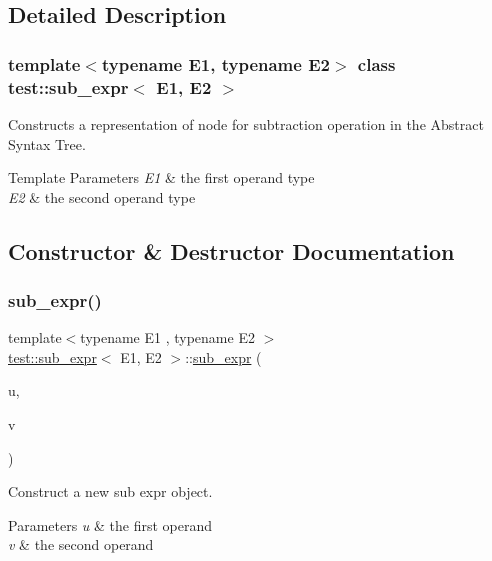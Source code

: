\subsection{Detailed Description}
\subsubsection*{template$<$typename E1, typename E2$>$\newline
class test\+::sub\+\_\+expr$<$ E1, E2 $>$}

Constructs a representation of node for subtraction operation in the Abstract Syntax Tree. 


\begin{DoxyTemplParams}{Template Parameters}
{\em E1} & the first operand type \\
\hline
{\em E2} & the second operand type \\
\hline
\end{DoxyTemplParams}


\subsection{Constructor \& Destructor Documentation}
\mbox{\label{classtest_1_1sub__expr_ac9dc8bae83439a35afd865aeb9ccf463}} 
\subsubsection{\texorpdfstring{sub\_expr()}{sub\_expr()}}
{\footnotesize\ttfamily template$<$typename E1 , typename E2 $>$ \\
\mbox{\hyperlink{classtest_1_1sub__expr}{test\+::sub\+\_\+expr}}$<$ E1, E2 $>$\+::\mbox{\hyperlink{classtest_1_1sub__expr}{sub\+\_\+expr}} (\begin{DoxyParamCaption}\item[{E1 const \&}]{u,  }\item[{E2 const \&}]{v }\end{DoxyParamCaption})\hspace{0.3cm}{\ttfamily [inline]}}



Construct a new sub expr object. 


\begin{DoxyParams}{Parameters}
{\em u} & the first operand \\
\hline
{\em v} & the second operand \\
\hline
\end{DoxyParams}


